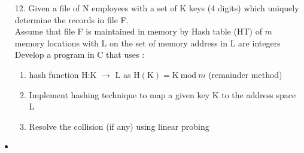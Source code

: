\documentclass{article}
\newcommand{\answer}{\item [$\rightarrow$]}
\begin{document}
	\begin{itemize}
		\item [12. ] Given a file of N employees with a set of K keys (4 digits) which uniquely determine the records in file F. \\
		Assume that file F is maintained in memory by Hash table (HT) of $m$ memory locations with L on the set of memory address in L are integers \\
		Develop a program in C that uses :
		\begin{enumerate}[label=\alph* .]
			\item hash function H:K $\rightarrow$ L as $\text{H}(\text{K})=\text{K} ~\text{mod}~ m$ (remainder method)
			\item Implement hashing technique to map a given key K to the address space L
			\item Resolve the collision (if any) using linear probing
		\end{enumerate}

		\answer \inputminted{c}{../Program12.c}
	\end{itemize}
\end{document}
